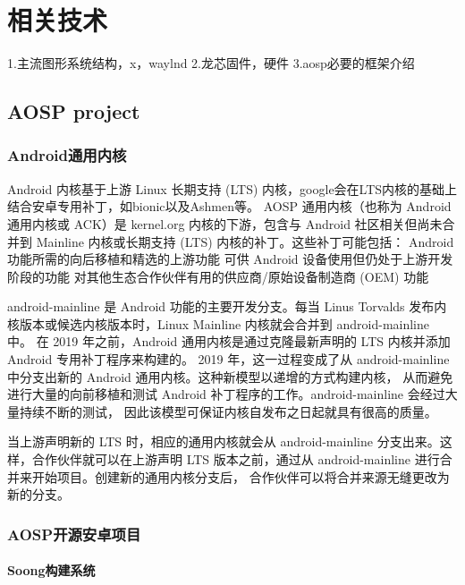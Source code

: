 
\chapter{相关技术}
1.主流图形系统结构，x，waylnd
2.龙芯固件，硬件
3.aosp必要的框架介绍

\section{AOSP project}

\subsection{Android通用内核}

Android 内核基于上游 Linux 长期支持 (LTS) 内核，google会在LTS内核的基础上结合安卓专用补丁，如bionic以及Ashmen等。
AOSP 通用内核（也称为 Android 通用内核或 ACK）是 kernel.org 内核的下游，包含与 Android 社区相关但尚未合并到 Mainline 
内核或长期支持 (LTS) 内核的补丁。这些补丁可能包括：
    Android 功能所需的向后移植和精选的上游功能
    可供 Android 设备使用但仍处于上游开发阶段的功能
    对其他生态合作伙伴有用的供应商/原始设备制造商 (OEM) 功能

android-mainline 是 Android 功能的主要开发分支。每当 Linus Torvalds 
发布内核版本或候选内核版本时，Linux Mainline 内核就会合并到 android-mainline 中。
在 2019 年之前，Android 通用内核是通过克隆最新声明的 LTS 内核并添加 Android 专用补丁程序来构建的。
2019 年，这一过程变成了从 android-mainline 中分支出新的 Android 通用内核。这种新模型以递增的方式构建内核，
从而避免进行大量的向前移植和测试 Android 补丁程序的工作。android-mainline 会经过大量持续不断的测试，
因此该模型可保证内核自发布之日起就具有很高的质量。

当上游声明新的 LTS 时，相应的通用内核就会从 android-mainline 分支出来。这样，合作伙伴就可以在上游声明 
LTS 版本之前，通过从 android-mainline 进行合并来开始项目。创建新的通用内核分支后，
合作伙伴可以将合并来源无缝更改为新的分支。

\subsection{AOSP开源安卓项目}
\subsubsection{Soong构建系统}

